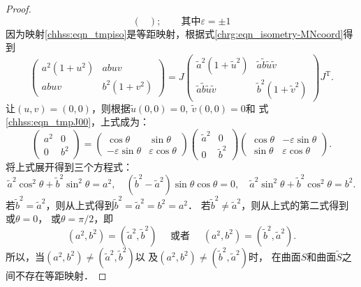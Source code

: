 \begin{proof}
\begin{equation}
\begin{pmatrix}
    \end{pmatrix}; 
    \qquad \text{其中} \varepsilon= \pm 1
\end{equation}
因为映射\eqref{chhss:eqn_tmpiso}是等距映射，根据式\eqref{chrg:eqn_isometry-MNcoord}得到
\begin{equation}
    \begin{pmatrix}
        a^2\left(1+u^2\right) & a b u v \\
        a b u v & b^2\left(1+v^2\right)
    \end{pmatrix} = J \begin{pmatrix}
        \tilde{a}^2\left(1+\tilde{u}^2\right) & \tilde{a} \tilde{b} \tilde{u} \tilde{v} \\
        \tilde{a} \tilde{b} \tilde{u} \tilde{v} & \tilde{b}^2\left(1+\tilde{v}^2\right)
    \end{pmatrix} J^{\mathrm{T}} .
\end{equation}
让$(u, v)=(0,0)$，则根据$\tilde{u}(0,0)=0,\ \tilde{v}(0,0)=0 $和
式\eqref{chhss:eqn_tmpJ00}，上式成为：
\begin{equation}
    \begin{pmatrix}
        a^2 & 0 \\   0 & b^2
    \end{pmatrix}= \begin{pmatrix}
        \cos \theta & \sin \theta \\
        -\varepsilon \sin \theta & \varepsilon \cos \theta
    \end{pmatrix} \begin{pmatrix}
        \tilde{a}^2 & 0 \\ 0 & \tilde{b}^2
    \end{pmatrix} \begin{pmatrix}
        \cos \theta & -\varepsilon \sin \theta \\
        \sin \theta & \varepsilon \cos \theta
    \end{pmatrix} .
\end{equation}
将上式展开得到三个方程式：
\setlength{\mathindent}{0em}
\begin{equation*} %
    \tilde{a}^2 \cos ^2 \theta+\tilde{b}^2 \sin ^2 \theta =a^2, \quad
    \left(\tilde{b}^2-\tilde{a}^2\right) \sin \theta \cos \theta  =0, \quad
    \tilde{a}^2 \sin ^2 \theta+\tilde{b}^2 \cos ^2 \theta  =b^2 .
\end{equation*} \setlength{\mathindent}{2em}
若$\tilde{b}^2=\tilde{a}^2$，则从上式得到$\tilde{b}^2=\tilde{a}^2=b^2=a^2$．
若$\tilde{b}^2 \neq \tilde{a}^2$，则从上式的第二式得到或$\theta=0$，
或$\theta=\pi / 2$，即
\begin{equation}
    \left(a^2, b^2\right)=\left(\tilde{a}^2, \tilde{b}^2\right)
    \quad \text { 或者 } \quad 
    \left(a^2, b^2\right)=\left(\tilde{b}^2, \tilde{a}^2\right) .
\end{equation}
所以，当$(a^2, b^2) \neq (\tilde{a}^2, \tilde{b}^2 )$以
及$(a^2, b^2)\neq(\tilde{b}^2, \tilde{a}^2)$时，
在曲面$S$和曲面$\tilde{S}$之间不存在等距映射．
\end{proof}


